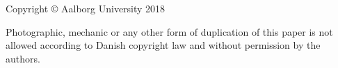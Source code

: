 \thispagestyle{empty}
{\small
\strut\vfill %
\noindent Copyright \copyright{} Aalborg University 2018\par
\vspace{0.2cm}
\noindent Photographic, mechanic or any other form of duplication of this paper is not allowed according to Danish copyright law and without permission by the authors.
}
\clearpage

